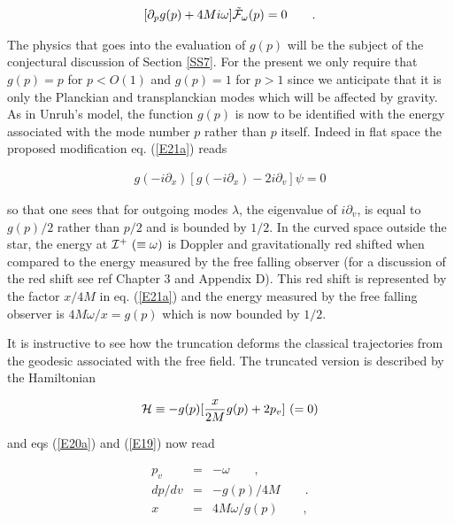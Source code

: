 \documentclass[12pt]{article}
\begin{document}
\begin{eqnarray}
\label{E21}
[ \partial_p  g(p) + 4 M i \omega  ] 
\tilde {\cal F}_ \omega (p) = 0\qquad .
\end{eqnarray}



\noindent The physics that goes into the evaluation of $ { g} (p)$ will be
the subject of the conjectural discussion of Section \ref{SS7}. For the present
we only require that $ { g} (p) = p$ for $ p < O(1)$ and $ { g} (p)
= 1$ for $ p > 1$ since we anticipate that it is only the Planckian and
transplanckian modes which will be affected by gravity. As in Unruh's model,
the function $ g(p)$ is now to be identified with the energy associated with
the mode number $p$ rather than $p$ itself. Indeed in flat space the proposed
modification  eq. (\ref{E21a}) reads 

\begin{eqnarray}
\label{E22}
g(-i\partial_x) [ g (-i\partial_x) - 2 i\partial_v] \psi = 0
\end{eqnarray}



\noindent so that one sees that for outgoing modes $ \lambda$,  the eigenvalue
of $ i\partial_v$, is equal to $g(p)/2$ rather than $p/2$ and is bounded by $1/2$.
In the curved space outside the star, the energy at $ {\cal I}^+ \  (\equiv
\omega)$ is Doppler and gravitationally red shifted when compared to the energy
measured by the free falling observer (for a
discussion of the red shift see ref \cite{GO} Chapter 3 and Appendix D). This
red shift is represented by the factor $ x/4 M$ in  eq. (\ref{E21a}) and the
energy measured by the free falling observer is $ 4M\omega /x = g(p)$ which
is now bounded by $1/2$. 

It is instructive to see how the truncation deforms the classical trajectories
from the geodesic associated with the free field. The
truncated version is described by the Hamiltonian

\begin{eqnarray}
\label{E23}
{\cal H} \equiv -{ g} (p) [ {x \over 2M} { g} (p)  +  2 p_v ] \ ( = 0 )
\end{eqnarray}


\noindent and eqs (\ref{E20a})  and (\ref{E19}) now read

\begin{eqnarray}
p_v&=&-\omega \qquad ,\\
d p/ dv &=& - { g} (p) / 4 M \qquad .\label{E24a}\\
x &=&  4 M \omega / g (p) \qquad ,\label {E24} 
\end{eqnarray}
\end{document}
